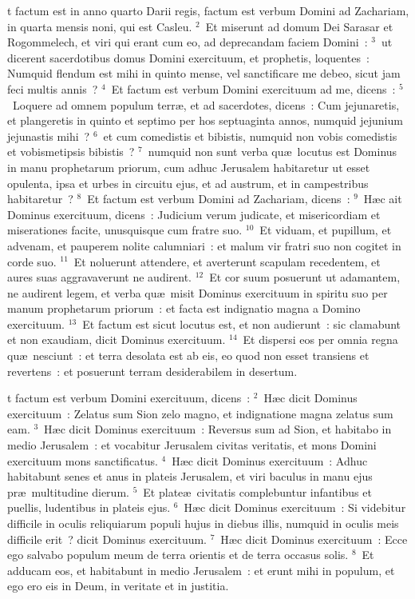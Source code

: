 \bchapter
{}t factum est in anno quarto Darii regis, factum est verbum Domini ad Zachariam, in quarta mensis noni, qui est Casleu.
${}^{2}$~Et miserunt ad domum Dei Sarasar et Rogommelech, et viri qui erant cum eo, ad deprecandam faciem Domini~:
${}^{3}$~ut dicerent sacerdotibus domus Domini exercituum, et prophetis, loquentes~: Numquid flendum est mihi in quinto mense, vel sanctificare me debeo, sicut jam feci multis annis~?
${}^{4}$~Et factum est verbum Domini exercituum ad me, dicens~:
${}^{5}$~Loquere ad omnem populum terr\ae , et ad sacerdotes, dicens~: Cum jejunaretis, et plangeretis in quinto et septimo per hos septuaginta annos, numquid jejunium jejunastis mihi~?
${}^{6}$~et cum comedistis et bibistis, numquid non vobis comedistis et vobismetipsis bibistis~?
${}^{7}$~numquid non sunt verba qu\ae\ locutus est Dominus in manu prophetarum priorum, cum adhuc Jerusalem habitaretur ut esset opulenta, ipsa et urbes in circuitu ejus, et ad austrum, et in campestribus habitaretur~?
${}^{8}$~Et factum est verbum Domini ad Zachariam, dicens~:
${}^{9}$~H\ae c ait Dominus exercituum, dicens~: Judicium verum judicate, et misericordiam et miserationes facite, unusquisque cum fratre suo.
${}^{10}$~Et viduam, et pupillum, et advenam, et pauperem nolite calumniari~: et malum vir fratri suo non cogitet in corde suo.
${}^{11}$~Et noluerunt attendere, et averterunt scapulam recedentem, et aures suas aggravaverunt ne audirent.
${}^{12}$~Et cor suum posuerunt ut adamantem, ne audirent legem, et verba qu\ae\ misit Dominus exercituum in spiritu suo per manum prophetarum priorum~: et facta est indignatio magna a Domino exercituum.
${}^{13}$~Et factum est sicut locutus est, et non audierunt~: sic clamabunt et non exaudiam, dicit Dominus exercituum.
${}^{14}$~Et dispersi eos per omnia regna qu\ae\ nesciunt~: et terra desolata est ab eis, eo quod non esset transiens et revertens~: et posuerunt terram desiderabilem in desertum.

\bchapter
{}t factum est verbum Domini exercituum, dicens~:
${}^{2}$~H\ae c dicit Dominus exercituum~: Zelatus sum Sion zelo magno, et indignatione magna zelatus sum eam.
${}^{3}$~H\ae c dicit Dominus exercituum~: Reversus sum ad Sion, et habitabo in medio Jerusalem~: et vocabitur Jerusalem civitas veritatis, et mons Domini exercituum mons sanctificatus.
${}^{4}$~H\ae c dicit Dominus exercituum~: Adhuc habitabunt senes et anus in plateis Jerusalem, et viri baculus in manu ejus pr\ae\ multitudine dierum.
${}^{5}$~Et plate\ae\ civitatis complebuntur infantibus et puellis, ludentibus in plateis ejus.
${}^{6}$~H\ae c dicit Dominus exercituum~: Si videbitur difficile in oculis reliquiarum populi hujus in diebus illis, numquid in oculis meis difficile erit~? dicit Dominus exercituum.
${}^{7}$~H\ae c dicit Dominus exercituum~: Ecce ego salvabo populum meum de terra orientis et de terra occasus solis.
${}^{8}$~Et adducam eos, et habitabunt in medio Jerusalem~: et erunt mihi in populum, et ego ero eis in Deum, in veritate et in justitia.


